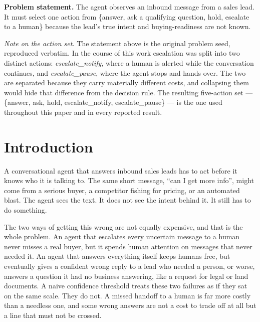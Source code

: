 \documentclass{article}
\begin{document}
%
\noindent\textbf{Problem statement.}
The agent observes an inbound message from a sales lead. It must
select one action from \{answer, ask a qualifying question, hold, escalate to a
human\} because the lead's true intent and buying-readiness are not known.

\medskip
\noindent\textit{Note on the action set.}
The statement above is the original problem seed, reproduced verbatim. In the
course of this work escalation was split into two distinct actions:
\emph{escalate\_notify}, where a human is alerted while the conversation
continues, and \emph{escalate\_pause}, where the agent stops and hands over. The
two are separated because they carry materially different costs, and collapsing
them would hide that difference from the decision rule. The resulting
five-action set --- \{answer, ask, hold, escalate\_notify, escalate\_pause\} ---
is the one used throughout this paper and in every reported result.


\section{Introduction}
\label{sec:intro}

A conversational agent that answers inbound sales leads has to act before it
knows who it is talking to. The same short message, ``can I get more info'',
might come from a serious buyer, a competitor fishing for pricing, or an
automated blast. The agent sees the text. It does not see the intent behind it.
It still has to do something.

The two ways of getting this wrong are not equally expensive, and that is the
whole problem. An agent that escalates every uncertain message to a human never
misses a real buyer, but it spends human attention on messages that never needed
it. An agent that answers everything itself keeps humans free, but eventually
gives a confident wrong reply to a lead who needed a person, or worse, answers a
question it had no business answering, like a request for legal or land
documents. A naive confidence threshold treats these two failures as if they sat
on the same scale. They do not. A missed handoff to a human is far more costly
than a needless one, and some wrong answers are not a cost to trade off at all
but a line that must not be crossed.
\end{document}
